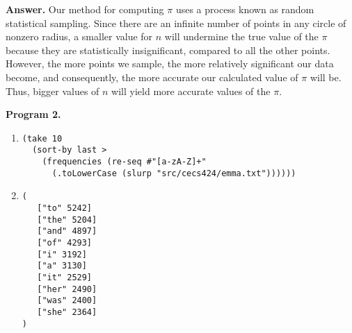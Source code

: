 \documentclass[9pt]{article}
\begin{document}
\begin{enumerate}
      \textbf{Answer.} Our method for computing $\pi$ uses a process known as
      random statistical sampling. Since there are an infinite number of points
      in any circle of nonzero radius, a smaller value for $n$ will undermine
      the true value of the $\pi$ because they are statistically insignificant,
      compared to all the other points. However, the more points we sample, the
      more relatively significant our data become, and consequently, the
      more accurate our calculated value of $\pi$ will be. Thus, bigger values
      of $n$ will yield more accurate values of the $\pi$.
\end{enumerate}


\textbf{Program 2.}
\begin{enumerate}
   \item \verb|(take 10| \\
         \verb|  (sort-by last >| \\
         \verb|    (frequencies (re-seq #"[a-zA-Z]+"| \\
         \verb|      (.toLowerCase (slurp "src/cecs424/emma.txt"))))))|
   \item \verb|(| \\
         \verb|   ["to" 5242]| \\
         \verb|   ["the" 5204]| \\
         \verb|   ["and" 4897]| \\
         \verb|   ["of" 4293]| \\
         \verb|   ["i" 3192]| \\
         \verb|   ["a" 3130]| \\
         \verb|   ["it" 2529]| \\
         \verb|   ["her" 2490]| \\
         \verb|   ["was" 2400]| \\
         \verb|   ["she" 2364]| \\
         \verb|)| 
\end{enumerate}
\end{document}
